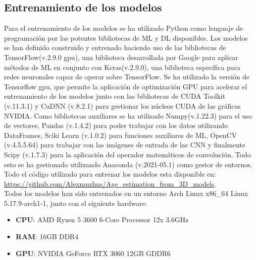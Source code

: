 \subsection{Entrenamiento de los modelos}
Para el entrenamiento de los modelos se ha utilizado Python como lenguaje de programación por las potentes bibliotecas de ML y DL disponibles. Los modelos se han definido construido y entrenado haciendo uso de las bibliotecas de TensorFlow(v.2.9.0 gpu), una biblioteca desarrollada por Google para aplicar métodos de ML en conjunto con Keras(v.2.9.0), una biblioteca específica para redes neuronales capaz de operar sobre TensorFlow. Se ha utilizado la versión de Tensorflow gpu, que permite la aplicación de optimización GPU para acelerar el entrenamiento de los modelos junto con las bibliotecas de CUDA Toolkit (v.11.3.1) y CuDNN (v.8.2.1) para gestionar los núcleos CUDA de las gráficas NVIDIA. Como bibliotecas auxiliares se ha utilizado Numpy(v.1.22.3) para el uso de vectores, Pandas (v.1.4.2) para poder trabajar con los datos utilizando DataFrames, Sciki Learn (v.1.0.2) para funciones auxiliares de ML, OpenCV (v.4.5.5.64) para trabajar con las imágenes de entrada de las CNN y finalmente Scipy (v.1.7.3) para la aplicación del operador matemáticos de convolución. Todo esto se ha gestionado utilizando Anaconda (v.2021-05.1) como gestor de entornos.\\

Todo el código utilizado para entrenar los modelos esta disponible en: \url{https://github.com/Alexmnzlms/Age_estimation_from_3D_models}.\\

Todos los modelos han sido entrenados en un entorno Arch Linux x86\_64 Linux 5.17.9-arch1-1, junto con el siguiente hardware:
\begin{itemize}
    \item \textbf{CPU}: AMD Ryzen 5 3600 6-Core Processor 12x 3.6GHz
    \item \textbf{RAM}: 16GB DDR4 
    \item \textbf{GPU}: NVIDIA GeForce RTX 3060 12GB GDDR6
\end{itemize}
